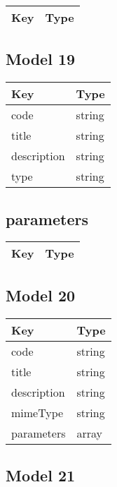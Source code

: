 \documentclass[10pt]{article}
\begin{document}
            \begin{tabularx}{\textwidth}{lZ}
                \textbf{Key} & \textbf{Type} \\
                \hline
            \end{tabularx}
            \subsection{Model 19}
            
            \begin{tabularx}{\textwidth}{lZ}
                \textbf{Key} & \textbf{Type} \\
                \hline
                    code & string \\
                    title & string \\
                    description & string \\
                    type & string \\
            \end{tabularx}
            \subsection{parameters}
            
            \begin{tabularx}{\textwidth}{lZ}
                \textbf{Key} & \textbf{Type} \\
                \hline
            \end{tabularx}
            \subsection{Model 20}
            
            \begin{tabularx}{\textwidth}{lZ}
                \textbf{Key} & \textbf{Type} \\
                \hline
                    code & string \\
                    title & string \\
                    description & string \\
                    mimeType & string \\
                    parameters & array \\
            \end{tabularx}
            \subsection{Model 21}
            
\end{document}
